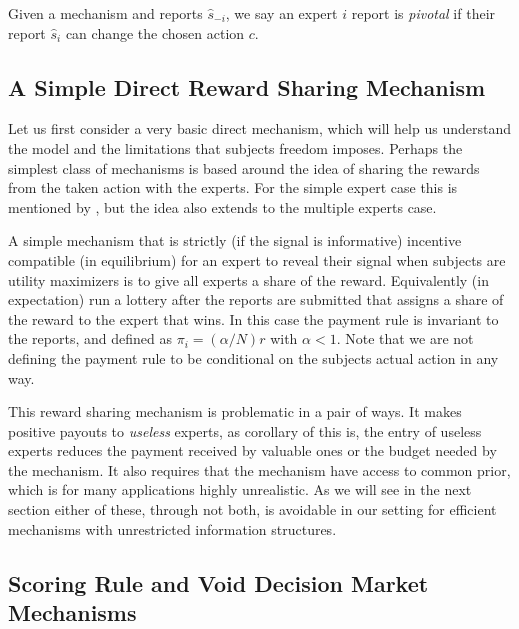 \begin{defn}\label{defn:pivotal}
Given a mechanism and reports $\hat{s}_{-i}$, we say an expert $i$ report is \emph{pivotal} if their report $\hat{s}_i$ can change the chosen action $c$.
\end{defn}


\subsection{A Simple Direct Reward Sharing Mechanism}


Let us first consider a very basic direct mechanism, which will help us understand the model and the limitations that subjects freedom imposes. 
Perhaps the simplest class of mechanisms is based around the idea of sharing the rewards from the taken action with the experts. For the simple expert case this is mentioned by \cite{othman2010decision}, but the idea also extends to the multiple experts case. 

A simple mechanism that is strictly (if the signal is informative) incentive compatible (in equilibrium) for an expert to reveal their signal when subjects are utility maximizers is to give all experts a share of the reward. Equivalently (in expectation) run a lottery after the reports are submitted that assigns a share of the reward to the expert that wins. 
In this case the payment rule is invariant to the reports, and defined as $\pi_i  = (\alpha / N ) r $ with $\alpha < 1$. Note that we are not defining the payment rule to be conditional on the subjects actual action in any way. %

This reward sharing mechanism is problematic in a pair of ways. It makes positive payouts to  \emph{useless} experts, as corollary of this is, the entry of useless experts reduces the payment received by valuable ones or the budget needed by the mechanism. It also requires that the mechanism have access to common prior, which is for many applications highly unrealistic. 
As we will see in the next section either of these, through not both, is avoidable in our setting for efficient mechanisms with unrestricted information structures. 



\subsection{Scoring Rule and Void Decision Market Mechanisms}

